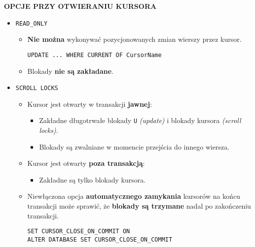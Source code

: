 \documentclass[a5paper,6pt]{article}
\begin{document}
    \textbf{OPCJE PRZY OTWIERANIU KURSORA}
    \begin{itemize}
        \item \texttt{READ\_ONLY}
        \begin{itemize}
            \item \textbf{Nie można} wykonywać pozycjonowanych zmian wierszy
                  przez kursor.
            \begin{verbatim}
UPDATE ... WHERE CURRENT OF CursorName
            \end{verbatim}

            \item Blokady \textbf{nie są zakładane}.
        \end{itemize}

        \item \texttt{SCROLL LOCKS}
        \begin{itemize}
            \item Kursor jest otwarty w transakcji \textbf{jawnej}:
            \begin{itemize}
                \item Zakładne długotrwałe blokady \texttt{U} \textit{(update)}
                      i blokady kursora \textit{(scroll locks)}.
                \item Blokady są zwalniane w momencie przejścia do innego
                      wiersza.
            \end{itemize}

            \item Kursor jest otwarty \textbf{poza transakcją}:
            \begin{itemize}
                \item Zakładne są tylko blokady kursora.
            \end{itemize}

            \item Niewłączona opcja \textbf{automatycznego zamykania} kursorów
                  na końcu transakcji może sprawić, że
                  \textbf{blokady są trzymane} nadal po zakończeniu transakcji.

            \begin{verbatim}
SET CURSOR_CLOSE_ON_COMMIT ON
ALTER DATABASE SET CURSOR_CLOSE_ON_COMMIT
            \end{verbatim}
        \end{itemize}


\end{itemize}
\end{document}
